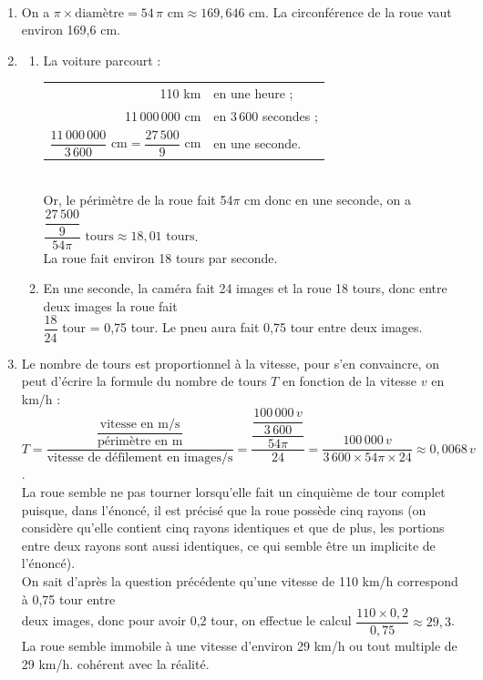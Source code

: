 \begin{corrige}
\ \\ [-5mm]
\begin{enumerate}
   \item On a $\pi\times\text{diamètre} =54\,\pi\text{ cm} \approx169,646\text{ cm}$. {\blue La circonférence de la roue vaut environ 169,6 cm.}
   \item
      \begin{enumerate}
         \item La voiture parcourt :
            {
            \begin{tabular}[t]{rl}
               110 km & en une heure ; \\
               11\,000\,000 cm & en 3\,600 secondes ; \\ [1mm]
               $\dfrac{11\,000\,000}{3\,600}\text{ cm} =\dfrac{27\,500}{9}\text{ cm}$ & en une seconde. \\
            \end{tabular}} \\
            Or, le périmètre de la roue fait 54$\pi$ cm donc en une seconde, on a $\dfrac{\dfrac{27\,500}{9}}{54\pi}\text{ tours} \approx18,01\text{ tours}$. \\
            {\blue La roue fait environ 18 tours par seconde.}
         \item En une seconde, la caméra fait 24 images et la roue 18 tours, donc entre deux images la roue fait \\
            $\dfrac{18}{24}$ tour = 0,75 tour. {\blue Le pneu aura fait 0,75 tour entre deux images.} \smallskip
      \end{enumerate}
   \setcounter{enumi}{1}
   \item Le nombre de tours est proportionnel à la vitesse, pour s'en convaincre, on peut d'écrire la formule du nombre de tours $T$ en fonction de la vitesse $v$ en km/h : \\ [1mm]
      $T =\dfrac{\dfrac{\text{vitesse en m/s}}{\text{périmètre en m}}}{\text{vitesse de défilement en images/s}} =\dfrac{\dfrac{\dfrac{100\,000\,v}{3\,600}}{54\pi}}{24} =\dfrac{100\,000\,v}{3\,600\times54\pi\times24} \approx 0,0068\,v$. \\ [2mm] 
      La roue semble ne pas tourner lorsqu'elle fait un cinquième de tour complet puisque, dans l'énoncé, il est précisé que la roue possède cinq rayons (on considère qu'elle contient cinq rayons identiques et que de plus, les portions entre deux rayons sont aussi identiques, ce qui semble être un implicite de l'énoncé). \\
      On sait d'après la question précédente qu'une vitesse de 110 km/h correspond à 0,75 tour entre \\ [1mm] deux images, donc pour avoir 0,2 tour, on effectue le calcul $\dfrac{110\times0,2}{0,75} \approx29,3$. \\
      {\blue La roue semble immobile à une vitesse d'environ 29 km/h ou tout multiple de 29 km/h. cohérent avec la réalité.}
   \end{enumerate}
\end{corrige}

